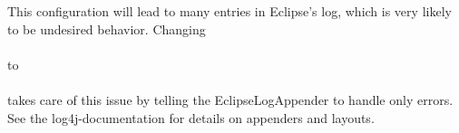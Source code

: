 \documentclass{seal_article}
\begin{document}
This configuration will lead to many entries in Eclipse's log, which is very likely to be undesired behavior. Changing\\

\noindent {}\\

\noindent to\\

\noindent {}\\

\noindent takes care of this issue by telling the EclipseLogAppender to handle only errors. See the log4j-documentation for details on appenders and layouts.



\end{document}

